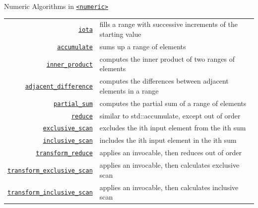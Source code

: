 \documentclass[14pt,aspectratio=1610]{beamer}
\begin{document}
\begin{frame}{Numeric Algorithms in \href{https://en.cppreference.com/w/cpp/header/numeric}{\texttt{<numeric>}}}
\footnotesize\renewcommand{\ULdepth}{3pt}\renewcommand{\arraystretch}{1.3}
\begin{tabularx}{\textwidth}{r X}
\href{https://en.cppreference.com/w/cpp/algorithm/iota}{\lstinline{iota}} &
  fills a range with successive increments of the starting value\\
\href{https://en.cppreference.com/w/cpp/algorithm/accumulate}{\lstinline{accumulate}} &
  sums up a range of elements\\
\href{https://en.cppreference.com/w/cpp/algorithm/inner_product}{\lstinline{inner_product}} &
  computes the inner product of two ranges of elements\\
\href{https://en.cppreference.com/w/cpp/algorithm/adjacent_difference}{\lstinline{adjacent_difference}} &
  computes the differences between adjacent elements in a range\\
\href{https://en.cppreference.com/w/cpp/algorithm/partial_sum}{\lstinline{partial_sum}} &
  computes the partial sum of a range of elements\\
\href{https://en.cppreference.com/w/cpp/algorithm/reduce}{\lstinline{reduce}} &
  similar to std::accumulate, except out of order\\
\href{https://en.cppreference.com/w/cpp/algorithm/exclusive_scan}{\lstinline{exclusive_scan}} &
  excludes the ith input element from the ith sum\\
\href{https://en.cppreference.com/w/cpp/algorithm/inclusive_scan}{\lstinline{inclusive_scan}} &
  includes the ith input element in the ith sum\\
\href{https://en.cppreference.com/w/cpp/algorithm/transform_reduce}{\lstinline{transform_reduce}} &
  applies an invocable, then reduces out of order\\
\href{https://en.cppreference.com/w/cpp/algorithm/transform_exclusive_scan}{\lstinline{transform_exclusive_scan}} &
  applies an invocable, then calculates exclusive scan\\
\href{https://en.cppreference.com/w/cpp/algorithm/transform_inclusive_scan}{\lstinline{transform_inclusive_scan}} &
  applies an invocable, then calculates inclusive scan\\
\end{tabularx}
\end{frame}
\end{document}
